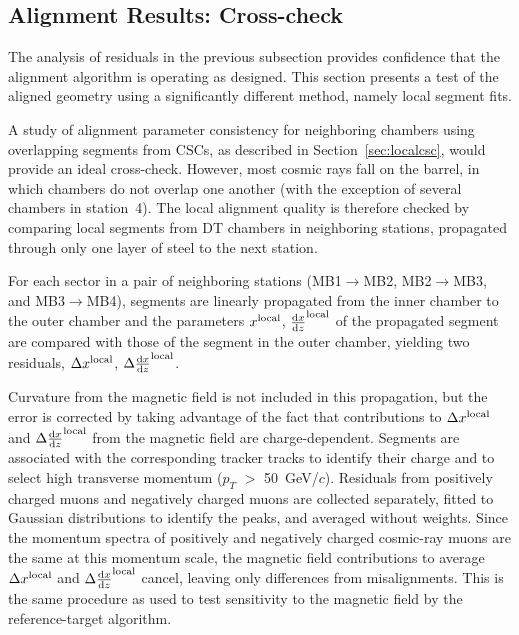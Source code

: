 \subsection{Alignment Results: Cross-check}
\label{sec:gmavalidation}

The analysis of residuals in the previous subsection provides
confidence that the alignment algorithm is operating as designed.  This section
presents a test of the aligned geometry using a
significantly different method, namely local segment fits.

A study of alignment parameter consistency for neighboring chambers
using overlapping segments from CSCs, as described in
Section~\ref{sec:localcsc}, would provide an ideal cross-check.  However, most
cosmic rays fall on the barrel, in which chambers do not overlap one another (with the
exception of several chambers in station~4).  The local alignment quality is
therefore checked by comparing local segments from DT chambers in neighboring stations,
propagated through only one layer of steel to the next station.

For each sector in a pair of neighboring stations (MB1$\to$MB2,
MB2$\to$MB3, and MB3$\to$MB4), segments are linearly propagated from the
inner chamber to the outer chamber and the parameters $x^{\mbox{\scriptsize local}}$,
${\frac{\textrm{d}x}{\textrm{d}z}}^{\mbox{\scriptsize local}}$ of the
propagated segment are compared with those of the segment in the outer chamber,
yielding two residuals, $\Delta x^{\mbox{\scriptsize local}}$,
$\Delta {\frac{\textrm{d}x}{\textrm{d}z}}^{\mbox{\scriptsize local}}$.

Curvature from the magnetic field is not included in this propagation,
but the error is corrected by taking advantage of the fact that
contributions to $\Delta x^{\mbox{\scriptsize local}}$ and $\Delta
{\frac{\textrm{d}x}{\textrm{d}z}}^{\mbox{\scriptsize local}}$ from the magnetic field
are charge-dependent.  Segments are associated with the corresponding
tracker tracks to identify their charge and to select high transverse momentum
($p_T$ $>$ 50~GeV/$c$).  Residuals from positively charged muons and
negatively charged muons are collected separately, fitted to Gaussian
distributions to identify the peaks, and averaged without weights.
Since the momentum spectra of positively and negatively charged
cosmic-ray muons are the same at this momentum scale, the magnetic
field contributions to average $\Delta x^{\mbox{\scriptsize local}}$
and $\Delta {\frac{\textrm{d}x}{\textrm{d}z}}^{\mbox{\scriptsize local}}$ cancel,
leaving only differences from misalignments.  This is the same
procedure as used to test sensitivity to the magnetic field by the
reference-target algorithm.

